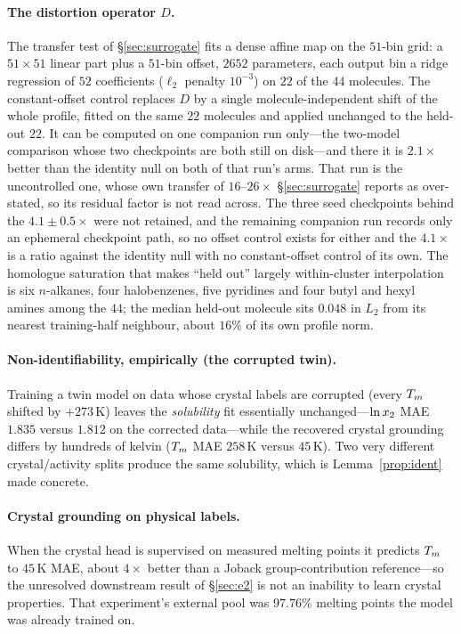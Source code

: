 \paragraph{The distortion operator $D$.} The transfer test of \S\ref{sec:surrogate} fits a
dense affine map on the $51$-bin grid: a $51\times51$ linear part plus a $51$-bin offset, $2652$
parameters, each output bin a ridge regression of $52$ coefficients ($\ell_2$ penalty $10^{-3}$) on
$22$ of the $44$ molecules.
The constant-offset control replaces $D$ by a single molecule-independent shift of the whole
profile, fitted on the same $22$ molecules and applied unchanged to the held-out $22$. It can be
computed on one companion run only---the two-model comparison whose two checkpoints are both still
on disk---and there it is $2.1\times$ better than the identity null on both of that run's arms.
That run is the uncontrolled one, whose own transfer of $16$--$26\times$ \S\ref{sec:surrogate}
reports as over-stated, so its residual factor is not read across. The three seed checkpoints behind the
$4.1\pm0.5\times$ were not retained, and the remaining companion run records only an ephemeral
checkpoint path, so no offset control exists for either and the $4.1\times$ is a ratio against the
identity null with no constant-offset control of its own. The homologue saturation that makes ``held out'' largely within-cluster
interpolation is six $n$-alkanes, four halobenzenes, five pyridines and four butyl and hexyl amines
among the $44$; the median held-out molecule sits $0.048$ in $L_2$ from its nearest training-half
neighbour, about $16\%$ of its own profile norm.
\paragraph{Non-identifiability, empirically (the corrupted twin).} Training a twin model
on data whose crystal labels are corrupted (every $T_m$ shifted by $+273$\,K) leaves the
\emph{solubility} fit essentially unchanged---$\ln x_2$ MAE $1.835$ versus $1.812$ on the
corrected data---while the recovered crystal grounding differs by hundreds of kelvin
($T_m$ MAE $258$\,K versus $45$\,K). Two very different crystal/activity splits produce
the same solubility, which is Lemma~\ref{prop:ident} made concrete.
\paragraph{Crystal grounding on physical labels.} When the crystal head is supervised
on measured melting points it predicts $T_m$ to $45$\,K MAE, about $4\times$ better than
a Joback group-contribution reference---so the unresolved downstream result of
\S\ref{sec:e2} is not an inability to learn crystal properties. That experiment's
external pool was $97.76\%$ melting points the model was already trained on.
